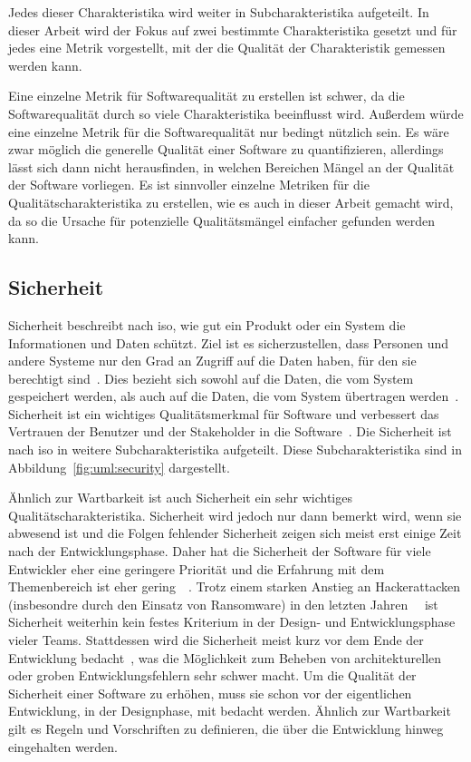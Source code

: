 \documentclass[12pt, a4paper, ngerman]{article}
\begin{document}
Jedes dieser Charakteristika wird weiter in Subcharakteristika aufgeteilt.
In dieser Arbeit wird der Fokus auf zwei bestimmte Charakteristika gesetzt
und für jedes eine Metrik vorgestellt,
mit der die Qualität der Charakteristik gemessen werden kann.

Eine einzelne Metrik für Softwarequalität zu erstellen ist schwer,
da die Softwarequalität durch so viele Charakteristika beeinflusst wird.
Außerdem würde eine einzelne Metrik für die Softwarequalität nur bedingt nützlich sein.
Es wäre zwar möglich die generelle Qualität einer Software zu quantifizieren,
allerdings lässt sich dann nicht herausfinden, 
in welchen Bereichen Mängel an der Qualität der Software vorliegen.
Es ist sinnvoller einzelne Metriken für die Qualitätscharakteristika
zu erstellen, wie es auch in dieser Arbeit gemacht wird,
da so die Ursache für potenzielle Qualitätsmängel
einfacher gefunden werden kann.

\subsection{Sicherheit}
\label{sec:sicherheit}

Sicherheit beschreibt nach \ac{iso}, wie gut ein Produkt oder ein System die Informationen und Daten schützt.
Ziel ist es sicherzustellen, dass Personen und andere Systeme nur den Grad an Zugriff auf die Daten haben, für den sie berechtigt sind~\cite{ISO25010}.
Dies bezieht sich sowohl auf die Daten, die vom System gespeichert werden, als auch auf die Daten, die vom System übertragen werden~\cite{ISO25010}.
Sicherheit ist ein wichtiges Qualitätsmerkmal für Software und verbessert das Vertrauen der Benutzer und der Stakeholder in die Software~\cite{ISO25010}.
Die Sicherheit ist nach \ac{iso} in weitere Subcharakteristika aufgeteilt.
Diese Subcharakteristika sind in Abbildung~\ref{fig:uml:security} dargestellt.

Ähnlich zur Wartbarkeit ist auch Sicherheit ein sehr wichtiges Qualitätscharakteristika.
Sicherheit wird jedoch nur dann bemerkt wird, wenn sie abwesend ist und 
die Folgen fehlender Sicherheit zeigen sich meist erst einige Zeit nach der Entwicklungsphase.
Daher hat die Sicherheit der Software für viele Entwickler eher eine geringere Priorität 
und die Erfahrung mit dem Themenbereich ist eher gering~\cite{Roshaidie_Liang_Jun_Yew_Fatima-Tuz-Zahra_2020}~\cite{Tahaei_Jenkins_Vaniea_Wolters_2021}.
Trotz einem starken Anstieg an Hackerattacken (insbesondre durch den Einsatz von Ransomware) 
in den letzten Jahren~\cite{BSI_2022}~\cite{Statistik_Cybersecurity_2022} ist Sicherheit weiterhin kein festes Kriterium 
in der Design- und Entwicklungsphase vieler Teams.
Stattdessen wird die Sicherheit meist kurz vor dem Ende der Entwicklung bedacht~\cite{Roshaidie_Liang_Jun_Yew_Fatima-Tuz-Zahra_2020}, 
was die Möglichkeit zum Beheben von architekturellen oder groben Entwicklungsfehlern sehr schwer macht.
Um die Qualität der Sicherheit einer Software zu erhöhen, muss sie schon vor der eigentlichen Entwicklung, 
in der Designphase, mit bedacht werden. Ähnlich zur Wartbarkeit gilt es Regeln und Vorschriften zu definieren, 
die über die Entwicklung hinweg eingehalten werden.
\end{document}
